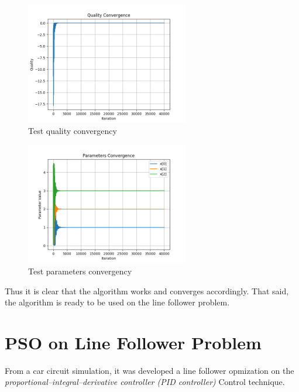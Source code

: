 \begin{figure}
  \begin{center}
  \includegraphics[width=2.8in]{./../code/test_function_result/test_quality_converge.png}
  \caption{Test quality convergency}
  \label{img:test_quality_converge}
  \end{center}
\end{figure}

\begin{figure}
  \begin{center}
  \includegraphics[width=2.8in]{./../code/test_function_result/test_parameters_converge.png}
  \caption{Test parameters convergency}
  \label{img:test_parameters_quality_converge}
  \end{center}
\end{figure}

Thus it is clear that the algorithm works and converges accordingly. That said, the algorithm is ready to be used on the line follower problem.

\section {PSO on Line Follower Problem}

From a car circuit simulation, it was developed a line follower opmization on the \textit{proportional–integral–derivative controller (PID controller)} Control technique.

